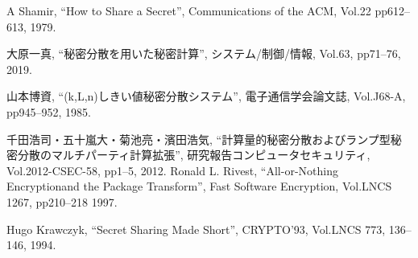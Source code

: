 \documentclass[twocolumn]{jarticle}
\begin{document}
\begin{thebibliography}{9}
	\renewcommand{\baselinestretch}{1.0}
	\small
		A Shamir,
		``How to Share a Secret'',
		Communications of the ACM, Vol.22 pp612--613, 1979.

		大原一真,
		``秘密分散を用いた秘密計算'',
		システム/制御/情報, Vol.63, pp71--76, 2019.

		山本博資,
		``(k,L,n)しきい値秘密分散システム'',
		電子通信学会論文誌, Vol.J68-A, pp945--952, 1985.

		千田浩司・五十嵐大・菊池亮・濱田浩気,
		``計算量的秘密分散およびランプ型秘密分散のマルチパーティ計算拡張'',
		研究報告コンピュータセキュリティ, Vol.2012-CSEC-58, pp1--5, 2012.
		Ronald L. Rivest,
		``All-or-Nothing Encryptionand the Package Transform'',
		Fast Software Encryption, Vol.LNCS 1267, pp210--218 1997.

		Hugo Krawczyk,
		``Secret Sharing Made Short'',
		CRYPTO'93, Vol.LNCS 773, 136--146, 1994.
\end{thebibliography}
\end{document}
